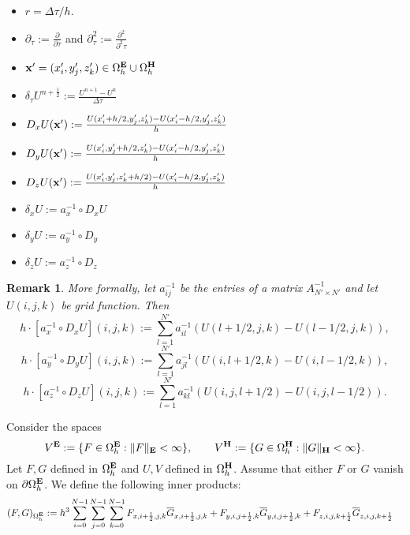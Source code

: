 \documentclass[12pt,reqno]{amsart}
\newcommand{\e}{{\bf E}}
\newcommand{\h}{{\bf H}}
\newtheorem{remark}[theorem]{Remark}
\theoremstyle{definition}
\numberwithin{equation}{section}
\def\Gwh{\Omega_h}
\begin{document}
	\begin{itemize}
		\item $r=\Delta \tau/h$.\\[1mm]
		\item  $\partial_{\tau}:=\frac{\partial}{\partial \tau}$ and $\partial_{\tau}^2:=\frac{\partial^2}{\partial^2 \tau}$\\[1mm]
		\item ${\bf x'}=(x_i',y_j',z_k')\in \Gwh^\e\cup\Gwh^\h$\\[1mm]
		\item $\delta_{\tau} U^{n+\frac{1}{2}}:=\frac{U^{n+1}-U^{n}}{\Delta \tau}$\\[1mm]
				\item $D_x U({\bf x'}):=\frac{U(x_i'+h/2,y_j',z_k')-U(x_i'-h/2,y_j',z_k')}{h}$\\[1mm]
	\item $D_y U({\bf x'}):=\frac{U(x_i',y_j'+h/2,z_k')-U(x_i'-h/2,y_j',z_k')}{h}$\\[1mm]
		\item $D_z U({\bf x'}):=\frac{U(x_i',y_j',z_k'+h/2)-U(x_i'-h/2,y_j',z_k')}{h}$\\[1mm]
		\item $\delta_x U:=a_x^{-1}\circ D_xU$\\[1mm]
		\item $\delta_y U:=a_y^{-1}\circ D_y$\\[1mm]
		\item 	$\delta_z U:=a_z^{-1}\circ D_z$\\[1mm]
	\end{itemize} 
\begin{remark}
More formally, let $a_{ij}^{-1}$ be the entries of a matrix $A_{N'\times N'}^{-1}$ and let $U(i,j,k)$ be grid function.
Then 
$$h\cdot [a_x^{-1}\circ D_xU](i,j,k):=\sum_{l=1}^{N'} a_{il}^{-1}(U(l+1/2,j,k)-U(l-1/2,j,k)),$$
$$h\cdot [a_y^{-1}\circ D_yU](i,j,k):=\sum_{l=1}^{N'} a_{jl}^{-1}(U(i,l+1/2,k)-U(i,l-1/2,k)),$$
$$h\cdot [a_z^{-1}\circ D_zU](i,j,k):=\sum_{l=1}^{N'} a_{kl}^{-1}(U(i,j,l+1/2)-U(i,j,l-1/2)).$$
\end{remark}
		Consider  the spaces 
		$$
		V^{\bf{E}}:=\{F \in \Gwh^{\bf{E}}:\|F\|_{\bf{E}}<\infty\}, \qquad 
		V^{\bf{H}}:=\{G \in \Gwh^{\bf{H}}:\|G\|_{\bf{H}}<\infty\}.
		$$
		Let $F,G$ defined in $\Gwh^{\bf{E}}$ and $U,V$ defined in 
		$\Gwh^{\bf{H}}$. Assume that either $F$ or $G$ vanish on $\partial \Gwh^\e$.
		We define the following inner products:
		\begin{align*}
&
		(F,G)_{\Gwh^\e}:=
		h^3\sum_{i=0}^{N-1}\sum_{j=0}^{N-1}\sum_{k=0}^{N-1}
		F_{x,i+\frac{1}{2},j,k}\overline{G}_{x,i+\frac{1}{2},j,k}+
		F_{y,i,j+\frac{1}{2},k}\overline{G}_{y,i,j+\frac{1}{2},k}+F_{z,i,j,k+\frac{1}{2}}\overline{G}_{z,i,j,k+\frac{1}{2}}
	\end{align*}
\end{document}
